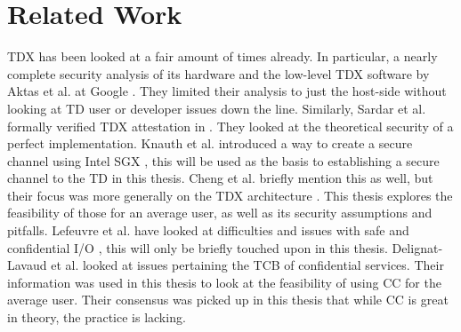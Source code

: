 \section{Related Work}
TDX has been looked at a fair amount of times already. In particular, a nearly complete security analysis of its hardware and the low-level TDX software by Aktas et al. at Google \cite{aktas_intel_nodate}. They limited their analysis to just the host-side without looking at TD user or developer issues down the line. Similarly, Sardar et al. formally verified TDX attestation in \cite{sardar_demystifying_2021}. They looked at the theoretical security of a perfect implementation. Knauth et al. introduced a way to create a secure channel using Intel SGX \cite{knauth_integrating_2019}, this will be used as the basis to establishing a secure channel to the TD in this thesis. Cheng et al. briefly mention this as well, but their focus was more generally on the TDX architecture \cite{cheng_intel_2023}. This thesis explores the feasibility of those for an average user, as well as its security assumptions and pitfalls. Lefeuvre et al. have looked at difficulties and issues with safe and confidential I/O \cite{lefeuvre_towards_2023}, this will only be briefly touched upon in this thesis. Delignat-Lavaud et al. looked at issues pertaining the TCB of confidential services. Their information was used in this thesis to look at the feasibility of using CC for the average user. Their consensus was picked up in this thesis that while CC is great in theory, the practice is lacking.

